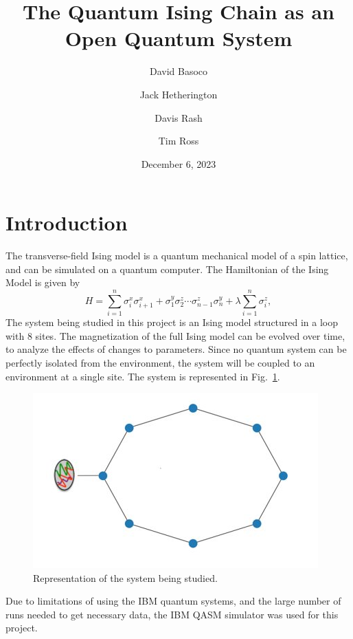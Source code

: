 \documentclass[12pt]{article}
\title{The Quantum Ising Chain as an Open Quantum System}
\author{David Basoco \and Jack Hetherington \and Davis Rash \and Tim Ross}
\date{December 6, 2023}
\begin{document}
  \maketitle


  \section{Introduction}

The transverse-field Ising model is a quantum mechanical model of a spin lattice, and can be simulated on a quantum computer. The Hamiltonian of the Ising Model is given by 
\begin{equation}
    \label{eq:hamiltonian}
    H = \sum_{i = 1}^{n} \sigma_{i}^{x} \sigma_{i + 1}^{x}
        + \sigma_{1}^{y} \sigma_{2}^{z} \dotsm \sigma_{n - 1}^{z} \sigma_{n}^{y}
        + \lambda \sum_{i = 1}^{n} \sigma_{i}^{z},
  \end{equation}
 The system being studied in this project is an Ising model structured in a loop with 8 sites.
 The magnetization of the full Ising model can be evolved over time, to analyze the effects of changes to parameters. Since no quantum system can be perfectly isolated from the environment, the system will be coupled to an environment at a single site. The system is represented in Fig.~\ref{fig:SystemDiagram}.
\begin{figure}[!htb]
    \centering
    \includegraphics[width=\textwidth]{images/SystemDiagram.png}
    \caption{Representation of the system being studied.%
      \label{fig:SystemDiagram}}
  \end{figure}
Due to limitations of using the IBM quantum systems, and the large number of runs needed to get necessary data, the IBM QASM simulator was used for this project. 
\end{document}
